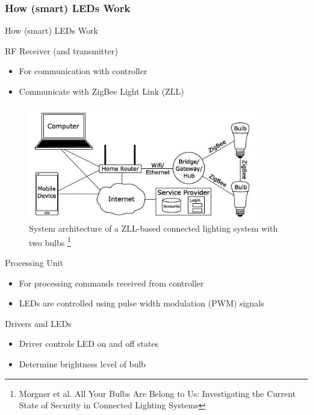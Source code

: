\documentclass[11pt,t,usepdftitle=false,aspectratio=169]{beamer}
\begin{document}
\subsubsection{How (smart) LEDs Work}%
\label{sub:how_smart_leds_work}
\begin{frame}{How (smart) LEDs Work}
     {
        \begin{block}{RF Receiver (and transmitter)}
            \begin{itemize}
                \item For communication with controller
                \item Communicate with ZigBee Light Link (ZLL)
            \end{itemize}
        \end{block}
    }
     {
         \begin{figure}
            \centering
            \includegraphics[height=5cm,keepaspectratio]{img/ZLL.JPG}
            \caption{\small{System architecture of a ZLL-based connected lighting system with two bulbs} \footnote{\tiny{Morgner et al. All Your Bulbs Are Belong to Us: Investigating the Current State of Security in Connected Lighting Systems}}}
         \end{figure}
    }
     {
        \begin{block}{Processing Unit}
            \begin{itemize}
                \item For processing commands received from controller
                \item LEDs are controlled using pulse width modulation (PWM) signals
            \end{itemize}
        \end{block}
        
        \begin{block}{Drivers and LEDs}
            \begin{itemize}
                \item Driver controls LED on and off states
                \item Determine brightness level of bulb
            \end{itemize}
        \end{block}
    }
     {
         
}
\end{frame}
\end{document}
